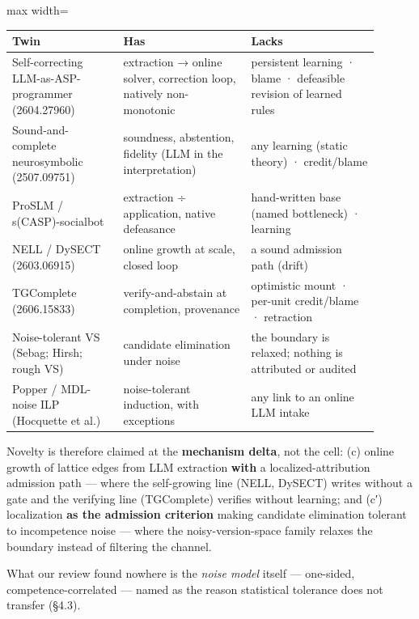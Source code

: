 \documentclass[11pt]{article}
\begin{document}
\begin{center}\small\begin{adjustbox}{max width=\linewidth}\begin{tabular}{>{\raggedright\arraybackslash}p{0.273\linewidth}>{\raggedright\arraybackslash}p{0.315\linewidth}>{\raggedright\arraybackslash}p{0.315\linewidth}}\toprule
Twin & Has & Lacks \\ \midrule
Self-correcting LLM-as-ASP-programmer (2604.27960) & extraction → online solver, correction loop, natively non-monotonic & persistent learning · blame · defeasible revision of learned rules \\
Sound-and-complete neurosymbolic (2507.09751) & soundness, abstention, fidelity (LLM in the interpretation) & any learning (static theory) · credit/blame \\
ProSLM / s(CASP)-socialbot & extraction ÷ application, native defeasance & hand-written base (named bottleneck) · learning \\
NELL / DySECT (2603.06915) & online growth at scale, closed loop & a sound admission path (drift) \\
TGComplete (2606.15833) & verify-and-abstain at completion, provenance & optimistic mount · per-unit credit/blame · retraction \\
Noise-tolerant VS (Sebag; Hirsh; rough VS) & candidate elimination under noise & the boundary is relaxed; nothing is attributed or audited \\
Popper / MDL-noise ILP (Hocquette et al.) & noise-tolerant induction, with exceptions & any link to an online LLM intake \\
\bottomrule\end{tabular}\end{adjustbox}\end{center}

Novelty is therefore claimed at the \textbf{mechanism delta}, not the cell: (c) online growth of lattice edges from LLM extraction \textbf{with} a localized-attribution admission path — where the self-growing line (NELL, DySECT) writes without a gate and the verifying line (TGComplete) verifies without learning; and (c′) localization \textbf{as the admission criterion} making candidate elimination tolerant to incompetence noise — where the noisy-version-space family relaxes the boundary instead of filtering the channel.

What our review found nowhere is the \emph{noise model} itself — one-sided, competence-correlated — named as the reason statistical tolerance does not transfer (§4.3).
\end{document}
